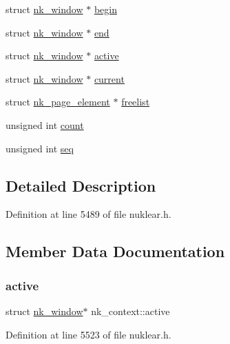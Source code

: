 \begin{DoxyCompactItemize}
\item 
struct \mbox{\hyperlink{structnk__window}{nk\+\_\+window}} $\ast$ \mbox{\hyperlink{structnk__context_a43a1c4cf1a69b90ad33b78789915d4eb}{begin}}
\item 
struct \mbox{\hyperlink{structnk__window}{nk\+\_\+window}} $\ast$ \mbox{\hyperlink{structnk__context_a70f3687079206d314b2006db5fc3da05}{end}}
\item 
struct \mbox{\hyperlink{structnk__window}{nk\+\_\+window}} $\ast$ \mbox{\hyperlink{structnk__context_ab8d399ddadeb71a3d68fe6ec063a4eaf}{active}}
\item 
struct \mbox{\hyperlink{structnk__window}{nk\+\_\+window}} $\ast$ \mbox{\hyperlink{structnk__context_a63efcbf544ff88f819f4d7e03927d7c6}{current}}
\item 
struct \mbox{\hyperlink{structnk__page__element}{nk\+\_\+page\+\_\+element}} $\ast$ \mbox{\hyperlink{structnk__context_aa66b352c5a05615e844a4e065186aa85}{freelist}}
\item 
unsigned int \mbox{\hyperlink{structnk__context_a332f044ac74fd5450fa61097ea45be65}{count}}
\item 
unsigned int \mbox{\hyperlink{structnk__context_a4ca2377a51d98a451bdcc61ccd967820}{seq}}
\end{DoxyCompactItemize}


\subsection{Detailed Description}


Definition at line 5489 of file nuklear.\+h.



\subsection{Member Data Documentation}
\mbox{\label{structnk__context_ab8d399ddadeb71a3d68fe6ec063a4eaf}} 
\subsubsection{\texorpdfstring{active}{active}}
{\footnotesize\ttfamily struct \mbox{\hyperlink{structnk__window}{nk\+\_\+window}}$\ast$ nk\+\_\+context\+::active}



Definition at line 5523 of file nuklear.\+h.

